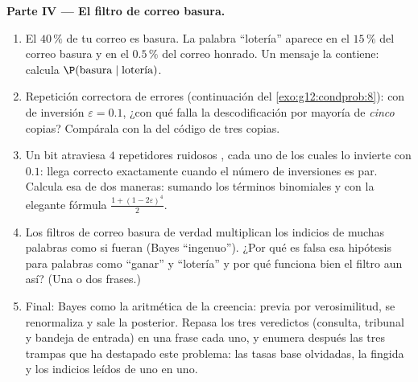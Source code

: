 \begin{problem}
\medskip
\noindent\textbf{Parte IV --- El filtro de correo basura.}
\begin{enumerate}[resume]
  \item El $40\,\%$ de tu correo es basura. La palabra ``lotería'' aparece
        en el $15\,\%$ del correo basura y en el $0.5\,\%$ del correo
        honrado. Un mensaje la contiene: calcula
        $\P(\text{basura} \mid \text{lotería})$.
  \item Repetición correctora de errores (continuación del
        \cref{exo:g12:condprob:8}): con  de inversión
        $\varepsilon = 0.1$, ¿con qué  falla la
        descodificación por mayoría de \emph{cinco} copias? Compárala con
        la del código de tres copias.
  \item Un bit atraviesa $4$ repetidores ruidosos , cada uno
        de los cuales lo invierte con  $0.1$: llega correcto
        exactamente cuando el número de inversiones es par. Calcula esa
         de dos maneras: sumando los términos binomiales y con
        la elegante fórmula $\frac{1 + (1 - 2\varepsilon)^4}{2}$.
  \item Los filtros de correo basura de verdad multiplican los indicios de
        muchas palabras como si fueran  (Bayes ``ingenuo'').
        ¿Por qué es falsa esa hipótesis para palabras como ``ganar'' y
        ``lotería'' y por qué funciona bien el filtro aun así? (Una o dos
        frases.)
  \item Final: Bayes como la aritmética de la creencia:  previa
        por verosimilitud, se renormaliza y sale la 
        posterior. Repasa los tres veredictos (consulta, tribunal y bandeja
        de entrada) en una frase cada uno, y enumera después las tres
        trampas que ha destapado este problema: las tasas base olvidadas,
        la  fingida y los indicios leídos de uno en uno.
\end{enumerate}
\end{problem}
